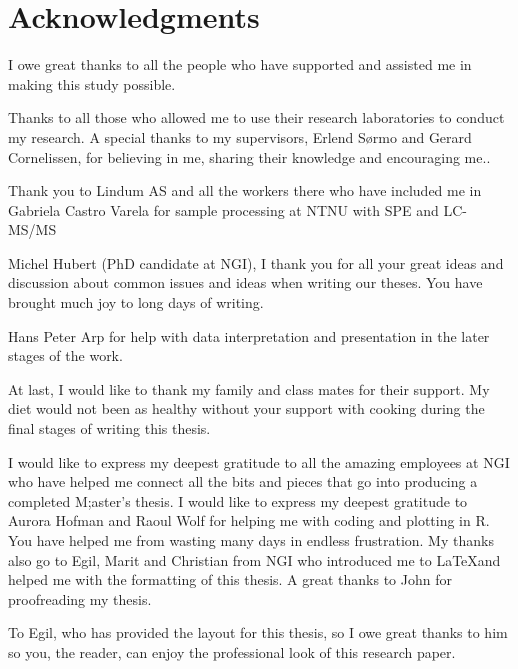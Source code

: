 \newpage
{}
\section*{Acknowledgments}
I owe great thanks to all the people who have supported and assisted me in making this study possible. 

Thanks to all those who allowed me to use their research laboratories to conduct my research. A special thanks to my supervisors, Erlend Sørmo and Gerard Cornelissen, for believing in me, sharing their knowledge and encouraging me.. 
  

Thank you to Lindum AS and all the workers there  who have included me in 
Gabriela Castro Varela for sample processing at NTNU with SPE and LC-MS/MS

Michel Hubert (PhD candidate at NGI), I thank you for all your great ideas and discussion about common issues and ideas when writing our theses. You have brought much joy to long days of writing. 

Hans Peter Arp for help with data interpretation and presentation in the later stages of the work. 

At last, I would like to thank my family and class mates for their support. My diet would not been as healthy without your support with cooking during the final stages of writing this thesis. 

I would like to express my deepest gratitude to all the amazing employees at NGI who have helped me connect all the bits and pieces that go into producing a completed M;aster's thesis. 
I would like to express my deepest gratitude to Aurora Hofman and Raoul Wolf for helping me with coding and plotting in R. You have helped me from wasting many days in  endless frustration. My thanks also go to Egil, Marit and Christian from NGI who introduced me to \LaTeX and helped me with the formatting of this thesis. A great thanks to John for proofreading my thesis. 

To Egil, who has provided the layout for this thesis, so I owe great thanks to him so you, the reader, can enjoy the professional look of this research paper. 